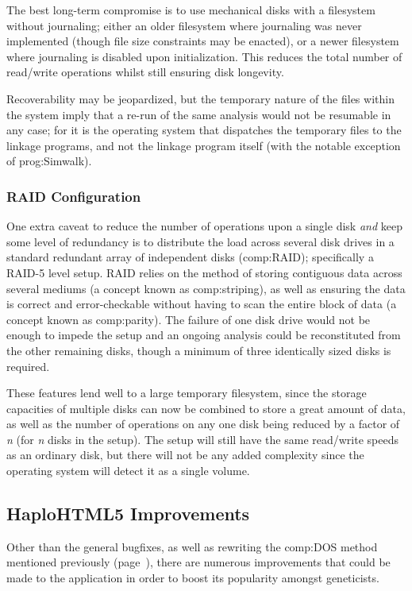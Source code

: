 The best long-term compromise is to use mechanical disks with a filesystem without journaling; either an older filesystem where journaling was never implemented (though file size constraints may be enacted), or a newer filesystem where journaling is disabled upon initialization. This reduces the total number of read/write operations whilst still ensuring disk longevity.

Recoverability may be jeopardized, but the temporary nature of the files within the system imply that a re-run of the same analysis would not be resumable in any case; for it is the operating system that dispatches the temporary files to the linkage programs, and not the linkage program itself (with the  notable exception of \gls{prog:Simwalk}).


\subsubsection{RAID Configuration}

One extra caveat to reduce the number of operations upon a single disk \textit{and} keep some level of redundancy is to distribute the load across several disk drives in a standard redundant array of independent disks (\gls{comp:RAID}); specifically a RAID-5 level setup. RAID relies on the method of storing contiguous data across several mediums (a concept known as \gls{comp:striping}), as well as ensuring the data is correct and error-checkable without having to scan the entire block of data (a concept known as \gls{comp:parity}). The failure of one disk drive would not be enough to impede the setup and an ongoing analysis could be reconstituted from the other remaining disks, though a minimum of three identically sized disks is required.

These features lend well to a large temporary filesystem, since the storage capacities of multiple disks can now be combined to store a great amount of data, as well as the number of operations on any one disk being reduced by a factor of \textit{n} (for \textit{n} disks in the setup). The setup will still have the same read/write speeds as an ordinary disk, but there will not be any added complexity since the operating system will detect it as a single volume.


\subsection{HaploHTML5 Improvements}

Other than the general bugfixes, as well as rewriting the \gls{comp:DOS} method mentioned previously (page~\pageref{ref:disc:dos}), there are numerous improvements that could be made to the application in order to boost its popularity amongst geneticists.


